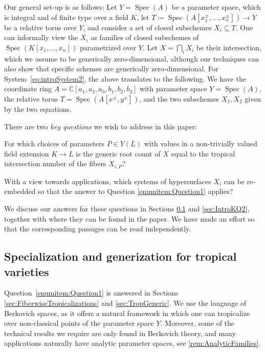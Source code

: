 \documentclass[12pt,reqno,a4paper]{amsart}
\makeatletter
\theoremstyle{theoremstyle}
\theoremstyle{examplestyle}
\theoremstyle{algorithmstyle}
\DeclareMathOperator{\Spec}{Spec}
\newcommand{\customlabel}[2]{%
   \protected@write \@auxout {}{\string \newlabel {#1}{{#2}{\thepage}{#2}{#1}{}} }%
   \hypertarget{#1}{#2}%
}
\makeatother
\begin{document}
Our general set-up is as follows:  Let $Y=\Spec(A)$ be a parameter space, which is integral and of finite type over a field $K$, let $T\coloneqq \Spec(A[x_{1}^{\pm},\dots,x_{n}^{\pm}]) \rightarrow Y$ be a relative torus over $Y$, and consider a set of closed subschemes $X_{i}\subseteq T$. One can informally view  the $X_{i}$ as families of closed subschemes of $\Spec(K[x_{1},\dots,x_{n}])$ parametrized over $Y$.  Let $X=\bigcap_i X_i$ be their intersection, which we assume to be generically zero-dimensional, although our techniques can also show that specific schemes are generically zero-dimensional.
For System~\eqref{eq:introSystem2}, the above translates to the following. We have %
the coordinate ring $A=\mathbb{C}[a_{1},a_{2},a_{3},b_{1},b_{2},b_{3}]$ with parameter space $Y=\Spec(A)$, %
the relative torus $T=\Spec(A[x^{\pm},y^{\pm}])$, and the two subschemes $X_1,X_2$ given by the two equations.  

There are two \emph{key questions} we wish to address in this paper:

\medskip

\begin{description}[leftmargin=5mm]
\item[Key Question 1]\label{enumitem:Question1}
  For which choices of parameters $P\in Y(L)$ with values in a non-trivially valued field extension $K\to L$ %
  is the generic root count of $X$ equal to the tropical intersection number of the fibers $X_{i,P}$?
\item[Key Question \customlabel{enumitem:Question2}{2}]
  With a view towards applications, which systems of hypersurfaces $X_i$ can be re-embedded so that the answer to Question \ref{enumitem:Question1} applies?
\end{description}

\medskip

We discuss our answers for these questions in Sections \ref{sec:IntroKQ1} and \ref{sec:IntroKQ2}, together with where they can be found in the paper. We have made an effort so that the corresponding passages can be read independently.



\subsection{Specialization and generization for tropical varieties}\label{sec:IntroKQ1}
Question~\ref{enumitem:Question1} is answered in Sections \ref{sec:FiberwiseTropicalizations} and \ref{sec:TropGeneric}.  We use the language of Berkovich spaces, as it offers a natural framework in which one can tropicalize over non-classical points of the parameter space $Y$.
Moreover, some of the technical results we require are only found in Berkovich theory, and many applications naturally have analytic parameter spaces, see \cref{rem:AnalyticFamilies}.
\end{document}
